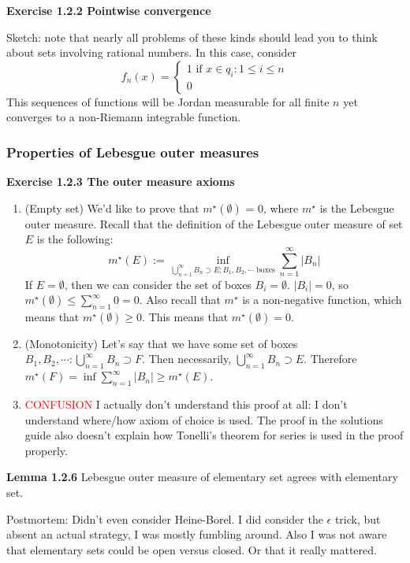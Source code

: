 \documentclass[answers,12pt]{exam}
\begin{document}
\textbf{Exercise 1.2.2 Pointwise convergence}
\begin{solution}
    Sketch: note that nearly all problems of these kinds should lead you to think about sets involving rational numbers.
    In this case, consider 
    \[
    f_n(x)=
        \begin{cases}
        1 \text{ if } x \in {q_i: 1 \leq i \leq n} \\
        0
        \end{cases}
    \]
    This sequences of functions will be Jordan measurable for all finite $n$ yet converges to a non-Riemann integrable function.
\end{solution}

\subsubsection{Properties of Lebesgue outer measures}

\textbf{Exercise 1.2.3 The outer measure axioms}
\begin{solution}
    \begin{enumerate}
        \item (Empty set) 
        We'd like to prove that $m^{\star}(\emptyset)$ = 0, where $m^{\star}$ is the Lebesgue outer measure.
        Recall that the definition of the Lebesgue outer measure of set $E$ is the following: \[m^{\star}(E):= \inf_{\bigcup_{n=1}^{\infty} B_n \supset E; B_1, B_2, \cdots \text{ boxes}} \sum_{n=1}^{\infty}|B_n|\]
        If $E=\emptyset$, then we can consider the set of boxes $B_i=\emptyset$.
        $|B_i| = 0$, so $m^{\star}(\emptyset) \leq \sum_{n=1}^{\infty}0 = 0$.
        Also recall that $m^{\star}$ is a non-negative function, which means that $m^{\star}(\emptyset) \geq 0$.
        This means that $m^{\star}(\emptyset) = 0$.
        \item (Monotonicity) Let's say that we have some set of boxes $B_1, B_2, \cdots : \bigcup_{n=1}^{\infty}B_n \supset F$.
        Then necessarily, $\bigcup_{n=1}^{\infty}B_n \supset E$.
        Therefore $m^{\star}(F) = \inf \sum_{n=1}^{\infty}|B_n| \geq m^{\star}(E)$.
        \item \textcolor{red}{CONFUSION} I actually don't understand this proof at all: I don't understand where/how axiom of choice is used.
        The proof in the solutions guide also doesn't explain how Tonelli's theorem for series is used in the proof properly.
    \end{enumerate}
\end{solution}
\textbf{Lemma 1.2.6} Lebesgue outer measure of elementary set agrees with elementary set.
\begin{solution}
    Postmortem:
    Didn't even consider Heine-Borel.
    I did consider the $\epsilon$ trick, but absent an actual strategy, I was mostly fumbling around.
    Also I was not aware that elementary sets could be open versus closed.
    Or that it really mattered.
\end{solution}
\end{document}
